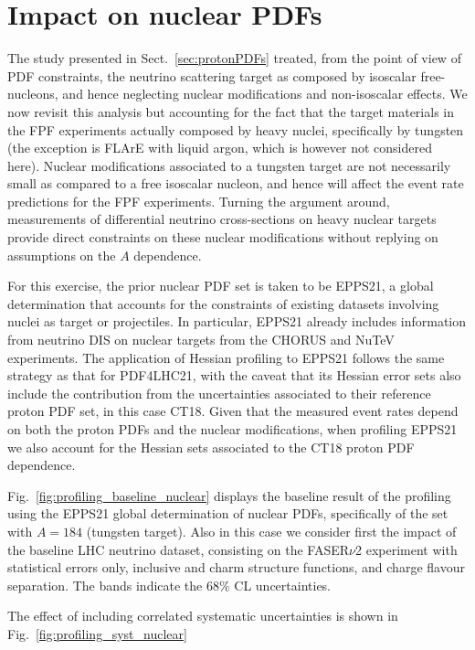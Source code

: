 \clearpage
\section{Impact on nuclear PDFs}
\label{sec:nuclearPDFs}

The study presented in Sect.~\ref{sec:protonPDFs} treated, from the point of view
of PDF constraints, the neutrino scattering target
as composed by isoscalar free-nucleons, and hence neglecting nuclear modifications
and non-isoscalar effects.
%
We now revisit this analysis but accounting for the fact that the target materials in the FPF
experiments actually
composed by heavy nuclei, specifically by tungsten (the exception is FLArE with liquid argon, which
is however not considered here).
%
Nuclear modifications associated to a tungsten target are not necessarily small as compared
to a free isoscalar nucleon, and hence will affect the event rate predictions for
the FPF experiments.
%
Turning the argument around, measurements of differential neutrino cross-sections
on heavy nuclear targets provide direct constraints on these nuclear modifications
without replying on assumptions on the $A$ dependence.

For this exercise, the prior nuclear PDF set is taken to be EPPS21, a global determination
that accounts for the constraints of existing datasets involving nuclei as target or projectiles.
%
In particular, EPPS21 already includes information from neutrino DIS on nuclear targets
from the CHORUS and NuTeV experiments.
%
The application of Hessian profiling to EPPS21 follows the same strategy as that
for PDF4LHC21, with the caveat that its Hessian error sets also include the contribution
from the uncertainties  associated to their reference proton PDF set, in this case CT18.
%
Given that the measured event rates depend on both the proton PDFs and the nuclear modifications,
when profiling EPPS21 we also account for the Hessian sets associated to the CT18 proton
PDF dependence.

Fig.~\ref{fig:profiling_baseline_nuclear} displays the baseline result of the profiling using the EPPS21 global determination of nuclear PDFs,
specifically of the set with $A=184$ (tungsten target).
%
Also in this case we consider first the impact of the baseline LHC neutrino dataset, consisting
on the FASER$\nu$2 experiment
with statistical errors only, inclusive and charm structure functions,  and charge flavour
separation.
%
The bands indicate the 68\% CL uncertainties.

{\color{red}
The effect of including correlated systematic uncertainties is shown in 
Fig.~\ref{fig:profiling_syst_nuclear}
}


